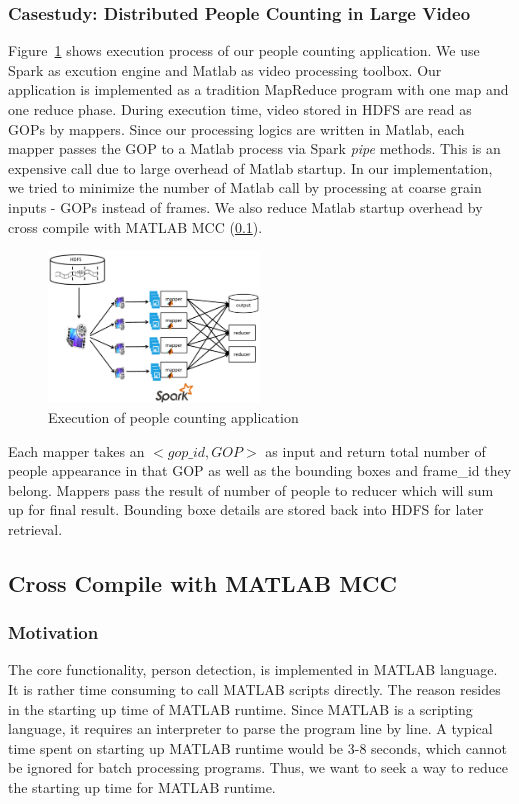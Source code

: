 \subsubsection{Casestudy: Distributed People Counting in Large Video}

Figure~\ref{fig:overview} shows execution process of our people counting
application. We use Spark as excution engine and Matlab as video processing
toolbox. Our application is implemented as a tradition MapReduce program with
one map and one reduce phase. During execution time, video stored in HDFS are read as GOPs by mappers. Since our processing logics are written in Matlab,
each mapper passes the GOP to a Matlab process via Spark \textit{pipe} methods.
This is an expensive call due to large overhead of Matlab startup. In our
implementation, we tried to minimize the number of Matlab call by processing at
coarse grain inputs - GOPs instead of frames. We also reduce Matlab startup
overhead by cross compile with MATLAB MCC (\textsection\ref{sec:mcc}).
\begin{figure}[htbp!]\centering
\vspace{-1ex}
\includegraphics[width=0.5\textwidth]{figures/overview.pdf}
\vspace{-4ex}
\caption{Execution of people counting application}
\label{fig:overview}
\end{figure}

Each mapper takes an $<gop\_id, GOP>$ as input and return total number of people
appearance in that GOP as well as the bounding boxes and frame\_id they belong.
Mappers pass the result of number of people to reducer which will sum up for
final result. Bounding boxe details are stored back into HDFS for later
retrieval.

\subsection{Cross Compile with MATLAB MCC}\label{sec:mcc}
\subsubsection{Motivation}
The core functionality, person detection, is implemented in MATLAB language. It
is rather time consuming to call MATLAB scripts directly. The reason resides in 
the starting up time of MATLAB runtime. Since MATLAB is a scripting language, 
it requires an interpreter to parse the program line by line. A typical time 
spent on starting up MATLAB runtime would be 3-8 seconds, which cannot be
ignored for batch processing programs. Thus, we want to seek a way to reduce 
the starting up time for MATLAB runtime.

